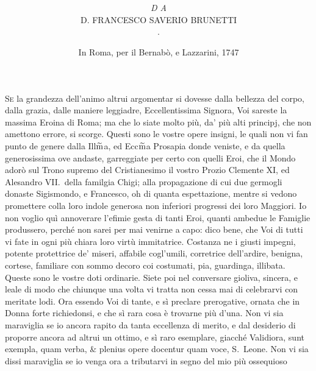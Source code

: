 \documentclass[11pt,a6paper]{article}
\title{\kern -42pt\fontsize{30}{30}\selectfont{\textls[80]{GIUOCHI}} \\ \kern 1pt \fontsize{10}{10}\selectfont{\textls[600]{DELLE}}\\ \fontsize{22}{22}\selectfont{MINCHIATE, OMBRE,} \\ \fontsize{18}{18}\selectfont{\textls[480]{SCACCHI},}\\ \kern 2pt \fontsize{11}{11}\selectfont{Ed altri d'ingegno}}
\author{\vspace{-30pt}\\
\textsc{\fontsize{12}{12}\selectfont{\textls[520]{dedicati}}}\\
\textit{\fontsize{11}{11}\selectfont{Alla Ill$\widetilde{\textit{m}}$a, ed Ecc$\widetilde{\textit{m}}$a Signora la Signora}}\\
\textsc{\fontsize{18}{18}\selectfont{\textls*[500]{principessa}}}\\
\textsc{\fontsize{30}{30}\selectfont{\textls*[120]{donna giulia}}}\\
\textsc{\fontsize{28}{28}\selectfont{\textls*[33]{albani chigi}}}\\
\textit{\footnotesize D A}\\
\small D. FRANCESCO SAVERIO BRUNETTI\\
\small \textls[360]{DA CORINALDO}.}
\date{\vfill\small In Roma, per il Bernabò, e Lazzarini, 1747 \\ \textit{\textls[80]{Con licenza de' Superiori.}}}
\begin{document}

\maketitle

\clearpage





\vspace{80pt}



\lettrine{S}e la grandezza dell'animo
altrui argomentar si dovesse
dalla bellezza del corpo, dalla grazia,
dalle maniere leggiadre, Eccellentissima
Signora, Voi sareste la massima Eroina di Roma;
ma che lo siate molto più, da' più alti principj,
che non amettono errore, si scorge. Questi
sono le vostre opere
insigni, le quali non vi fan punto de
genere dalla Ill$\widetilde{\textup{m}}$a, ed Ecc$\widetilde{\textup{m}}$a Prosapia
donde veniste, e da quella generosissima
ove andaste, garreggiate per certo con
quelli Eroi, che il Mondo adorò sul Trono
supremo del Cristianesimo il vostro
Prozio Clemente XI, ed Alesandro VII.\
della familgia Chigi; alla propagazione di
cui due germogli donaste Sigismondo, e
Francesco, oh di quanta espettazione, mentre
si vedono promettere colla loro indole generosa
non inferiori progressi dei loro Maggiori.
Io non voglio quì annoverare l'efimie
gesta di tanti Eroi, quanti ambedue
le Famiglie produssero, perché non sarei
per mai venirne a capo: dico bene, che
Voi di tutti vi fate in ogni più chiara loro
virtù immitatrice. Costanza ne i giusti
impegni, potente protettrice de' miseri,
affabile cogl'umili, corretrice dell'ardire,
benigna, cortese, familiare con sommo
decoro coi costumati, pia, guardinga, illibata.
Queste sono le vostre doti ordinarie.
Siete poi nel conversare gioliva, sincera,
e leale di modo che chiunque una
volta vi tratta non cessa mai di celebrarvi
con meritate lodi. Ora essendo Voi di
tante, e sì preclare prerogative, ornata
che in Donna forte richiedonsi, e che sì
rara cosa è trovarne più d'una. Non vi
sia maraviglia se io ancora rapito da tanta
eccellenza di merito, e dal desiderio di
proporre ancora ad altrui un ottimo, e sì
raro esemplare, giacché Validiora, sunt
exempla, quam verba, \& plenius opere
docentur quam voce, S.\ Leone. Non
vi sia dissi maraviglia se io venga ora a
tributarvi in segno del mio più ossequioso
\end{document}
